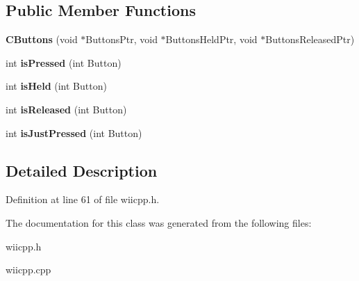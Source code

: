 \subsection*{Public Member Functions}
\begin{DoxyCompactItemize}
\item 
\hypertarget{class_c_buttons_ae5c226df45be410d158a792510af7f17}{{\bfseries C\-Buttons} (void $\ast$Buttons\-Ptr, void $\ast$Buttons\-Held\-Ptr, void $\ast$Buttons\-Released\-Ptr)}\label{class_c_buttons_ae5c226df45be410d158a792510af7f17}

\item 
\hypertarget{class_c_button_base_a0d4758b9e756a8c3c2bb39b907ea9170}{int {\bfseries is\-Pressed} (int Button)}\label{class_c_button_base_a0d4758b9e756a8c3c2bb39b907ea9170}

\item 
\hypertarget{class_c_button_base_a67e38daead9d22e33f6a3d85902d1f98}{int {\bfseries is\-Held} (int Button)}\label{class_c_button_base_a67e38daead9d22e33f6a3d85902d1f98}

\item 
\hypertarget{class_c_button_base_a575dee487bcca1abf29c1084dfdd5bb8}{int {\bfseries is\-Released} (int Button)}\label{class_c_button_base_a575dee487bcca1abf29c1084dfdd5bb8}

\item 
\hypertarget{class_c_button_base_ab74fd21217c5e379a613b7474af4f9b8}{int {\bfseries is\-Just\-Pressed} (int Button)}\label{class_c_button_base_ab74fd21217c5e379a613b7474af4f9b8}

\end{DoxyCompactItemize}


\subsection{Detailed Description}


Definition at line 61 of file wiicpp.\-h.



The documentation for this class was generated from the following files\-:\begin{DoxyCompactItemize}
\item 
wiicpp.\-h\item 
wiicpp.\-cpp\end{DoxyCompactItemize}
